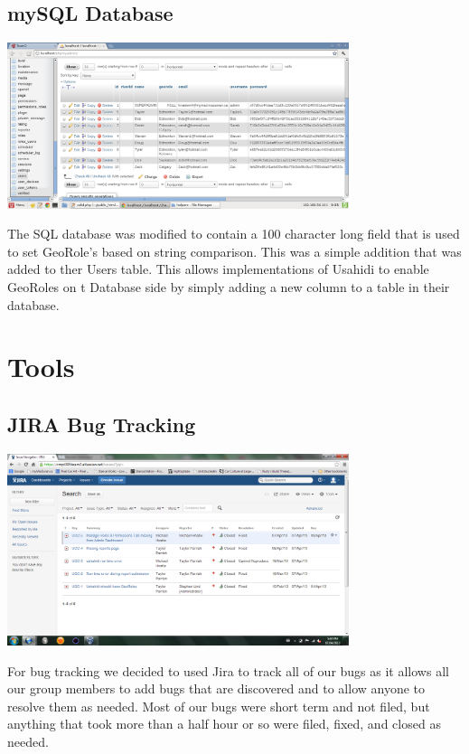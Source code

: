 \documentclass{article}
\begin{document}
\subsection{mySQL Database}
\begin{minipage}{\linewidth}
  \centering
  \includegraphics[width=100mm]{sql_table.png}
\end{minipage}
The SQL database was modified to contain a 100 character long field that is used to set GeoRole's based on string comparison.  This was a simple addition that was added to ther Users table.  This allows implementations of Usahidi to enable GeoRoles on t Database side by simply adding a new column to a table in their database.

\section{Tools}
\subsection{JIRA Bug Tracking}
\begin{minipage}{\linewidth}
  \centering
  \includegraphics[width=100mm]{jira_bug_list.png}
\end{minipage}
For bug tracking we decided to used Jira to track all of our bugs as it allows all our group members to add bugs that are discovered and to allow anyone to resolve them as needed. Most of our bugs were short term and not filed, but anything that took more than a half hour or so were filed, fixed, and closed as needed.
\end{document}
